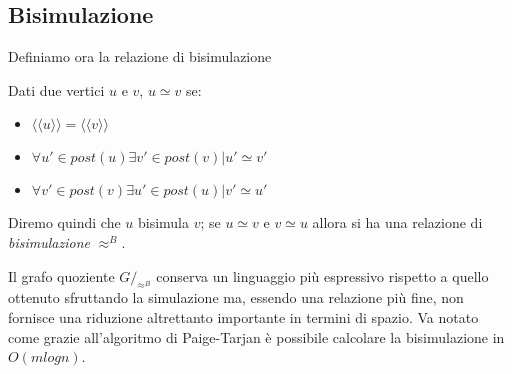 \subsection{Bisimulazione}
Definiamo ora la relazione di bisimulazione
\begin{definition}
Dati due vertici $u$ e $v$, $u \simeq v$ se:
\begin{itemize}
\item $\langle\langle u \rangle\rangle = \langle\langle v \rangle\rangle$
\item $\forall u' \in post(u) \exists v' \in post(v) | u' \simeq v'$
\item $\forall v' \in post(v) \exists u' \in post(u) | v' \simeq u'$
\end{itemize}
Diremo quindi che $u$ bisimula $v$; se $u \simeq v$ e $v \simeq u$ allora si ha una relazione di \emph{bisimulazione} $\approx^B$.
\end{definition}
Il grafo quoziente $G/_{\approx^B}$ conserva un linguaggio più espressivo rispetto a quello ottenuto sfruttando la simulazione ma, essendo una relazione più fine, non fornisce una riduzione altrettanto importante in termini di spazio. Va notato come grazie all'algoritmo di Paige-Tarjan è possibile calcolare la bisimulazione in $O(mlogn)$.


